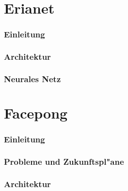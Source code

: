 \documentclass[12pt]{article}
\begin{document}
\tableofcontents
\newpage

\part{Erianet}
\section{Einleitung}
\section{Architektur}

\section{Neurales Netz}


\part{Facepong}
\section{Einleitung}
\section{Probleme und Zukunftspl"ane}
\section{Architektur}
\end{document}
